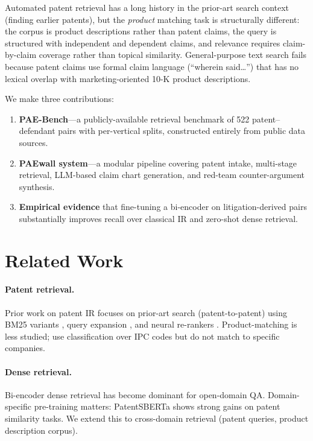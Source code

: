 \documentclass[11pt]{article}
\begin{document}
Automated patent retrieval has a long history in the prior-art search context (finding earlier patents), but the \emph{product} matching task is structurally different: the corpus is product descriptions rather than patent claims, the query is structured with independent and dependent claims, and relevance requires claim-by-claim coverage rather than topical similarity. General-purpose text search fails because patent claims use formal claim language (``wherein said\ldots'') that has no lexical overlap with marketing-oriented 10-K product descriptions.

We make three contributions:

\begin{enumerate}
    \item \textbf{PAE-Bench}---a publicly-available retrieval benchmark of 522 patent--defendant pairs with per-vertical splits, constructed entirely from public data sources.
    \item \textbf{PAEwall system}---a modular pipeline covering patent intake, multi-stage retrieval, LLM-based claim chart generation, and red-team counter-argument synthesis.
    \item \textbf{Empirical evidence} that fine-tuning a bi-encoder on litigation-derived pairs substantially improves recall over classical IR and zero-shot dense retrieval.
\end{enumerate}

\section{Related Work}

\paragraph{Patent retrieval.} Prior work on patent IR focuses on prior-art search (patent-to-patent) using BM25 variants \citep{robertson2009}, query expansion \citep{magdy2011}, and neural re-rankers \citep{risch2019}. Product-matching is less studied; \citet{abood2018} use classification over IPC codes but do not match to specific companies.

\paragraph{Dense retrieval.} Bi-encoder dense retrieval \citep{karpukhin2020} has become dominant for open-domain QA. Domain-specific pre-training matters: PatentSBERTa \citep{srebrovic2020} shows strong gains on patent similarity tasks. We extend this to cross-domain retrieval (patent queries, product description corpus).
\end{document}
